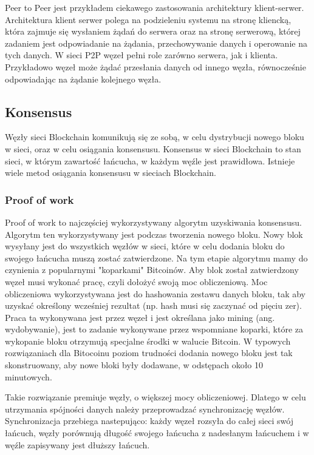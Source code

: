 \documentclass[a4paper,13pt]{report}
\begin{document}
Peer to Peer jest przykładem ciekawego zastosowania architektury klient-serwer. Architektura klient serwer polega na podzieleniu systemu na stronę kliencką, która zajmuje się wysłaniem żądań do serwera oraz na stronę serwerową, której zadaniem jest odpowiadanie na żądania, przechowywanie danych i operowanie na tych danych. W sieci P2P węzeł pełni role zarówno serwera, jak i klienta. Przykładowo węzeł może żądać przesłania danych od innego węzła, równocześnie odpowiadając na żądanie kolejnego węzła.
\subsection{Konsensus}
Węzły sieci Blockchain komunikują się ze sobą, w celu dystrybucji nowego bloku w sieci, oraz w celu osiągania konsensusu. Konsensus w sieci Blockchain to stan sieci, w którym zawartość łańcucha, w każdym węźle jest prawidłowa. Istnieje wiele metod osiągania konsensusu w sieciach Blockchain.

\subsubsection{Proof of work}

Proof of work to najczęściej wykorzystywany algorytm uzyskiwania konsensusu. Algorytm ten wykorzystywany jest podczas tworzenia nowego bloku. Nowy blok wysyłany jest do wszystkich węzłów w sieci, które w celu dodania bloku do swojego łańcucha muszą zostać zatwierdzone. Na tym etapie algorytmu mamy do czynienia z popularnymi "koparkami" Bitcoinów. Aby blok został zatwierdzony węzeł musi wykonać pracę, czyli dołożyć swoją moc obliczeniową. Moc obliczeniowa wykorzystywana jest do hashowania zestawu danych bloku, tak aby uzyskać określony wcześniej rezultat (np. hash musi się zaczynać od pięciu zer). Praca ta wykonywana jest przez węzeł i jest określana jako mining (ang. wydobywanie), jest to zadanie wykonywane przez wspomniane 
koparki, które za wykopanie bloku otrzymują specjalne środki w walucie Bitcoin. W typowych rozwiązaniach dla Bitocoinu poziom trudności dodania nowego bloku jest tak skonstruowany, aby nowe bloki były dodawane, w odstępach około 10 minutowych. 

Takie rozwiązanie premiuje węzły, o większej mocy obliczeniowej. Dlatego w celu utrzymania spójności danych należy przeprowadzać synchronizację węzłów. Synchronizacja przebiega nastepująco: 
każdy węzeł rozsyła do całej sieci swój łańcuch, węzły porównują długość swojego łańcucha z nadesłanym łańcuchem i w węźle zapisywany jest dłuższy łańcuch. 
\end{document}
